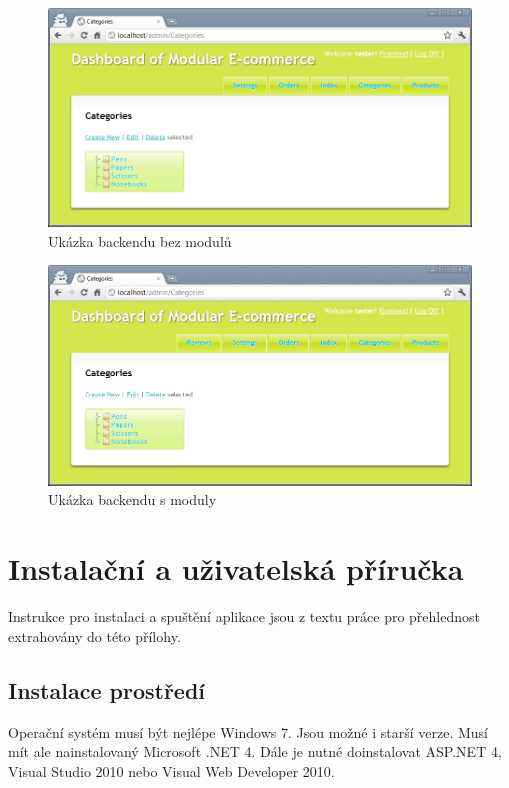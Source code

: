 \documentclass[11pt,twoside,a4paper]{book}
\begin{document}
\begin{figure}[h!]
\begin{center}
\includegraphics[scale=0.65,angle=0]{figures/backend1}
\caption{Ukázka backendu bez modulů}
\end{center}
\end{figure}

\begin{figure}[h!]
\begin{center}
\includegraphics[scale=0.65,angle=0]{figures/backend2}
\caption{Ukázka backendu s moduly}
\end{center}
\end{figure}

\chapter{Instalační a uživatelská příručka}

Instrukce pro instalaci a spuštění aplikace jsou z textu práce pro přehlednost extrahovány do této přílohy.

\section{Instalace prostředí}
Operační systém musí být nejlépe Windows 7. Jsou možné i starší verze. Musí mít ale nainstalovaný Microsoft .NET 4.
Dále je nutné doinstalovat ASP.NET 4, Visual Studio 2010 nebo Visual Web Developer 2010.
\end{document}

